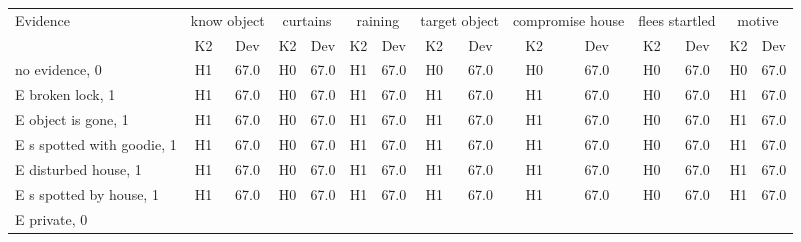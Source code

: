 \begin{table}\begin{tabular}{l|cc|cc|cc|cc|cc|cc|cc}\toprule\multirow{2}{*}{Evidence} & \multicolumn{2}{c}{know object}& \multicolumn{2}{c}{curtains}& \multicolumn{2}{c}{raining}& \multicolumn{2}{c}{target object}& \multicolumn{2}{c}{compromise house}& \multicolumn{2}{c}{flees startled}& \multicolumn{2}{c}{motive}\\& {K2} & {Dev}& {K2} & {Dev}& {K2} & {Dev}& {K2} & {Dev}& {K2} & {Dev}& {K2} & {Dev}& {K2} & {Dev}\\\midrule
no evidence, 0 & \cellcolor{Bittersweet}H1&\cellcolor{Bittersweet}67.0&\cellcolor{Bittersweet}H0&\cellcolor{Bittersweet}67.0&\cellcolor{Bittersweet}H1&\cellcolor{Bittersweet}67.0&\cellcolor{Bittersweet}H0&\cellcolor{Bittersweet}67.0&\cellcolor{Bittersweet}H0&\cellcolor{Bittersweet}67.0&\cellcolor{Bittersweet}H0&\cellcolor{Bittersweet}67.0&\cellcolor{Bittersweet}H0&\cellcolor{Bittersweet}67.0\\E broken lock, 1 & \cellcolor{Bittersweet}H1&\cellcolor{Bittersweet}67.0&\cellcolor{Bittersweet}H0&\cellcolor{Bittersweet}67.0&\cellcolor{Bittersweet}H1&\cellcolor{Bittersweet}67.0&\cellcolor{Bittersweet}H1&\cellcolor{Bittersweet}67.0&\cellcolor{Bittersweet}H1&\cellcolor{Bittersweet}67.0&\cellcolor{Bittersweet}H0&\cellcolor{Bittersweet}67.0&\cellcolor{Bittersweet}H1&\cellcolor{Bittersweet}67.0\\E object is gone, 1 & \cellcolor{Bittersweet}H1&\cellcolor{Bittersweet}67.0&\cellcolor{Bittersweet}H0&\cellcolor{Bittersweet}67.0&\cellcolor{Bittersweet}H1&\cellcolor{Bittersweet}67.0&\cellcolor{Bittersweet}H1&\cellcolor{Bittersweet}67.0&\cellcolor{Bittersweet}H1&\cellcolor{Bittersweet}67.0&\cellcolor{Bittersweet}H0&\cellcolor{Bittersweet}67.0&\cellcolor{Bittersweet}H1&\cellcolor{Bittersweet}67.0\\E s spotted with goodie, 1 & \cellcolor{Bittersweet}H1&\cellcolor{Bittersweet}67.0&\cellcolor{Bittersweet}H0&\cellcolor{Bittersweet}67.0&\cellcolor{Bittersweet}H1&\cellcolor{Bittersweet}67.0&\cellcolor{Bittersweet}H1&\cellcolor{Bittersweet}67.0&\cellcolor{Bittersweet}H1&\cellcolor{Bittersweet}67.0&\cellcolor{Bittersweet}H0&\cellcolor{Bittersweet}67.0&\cellcolor{Bittersweet}H1&\cellcolor{Bittersweet}67.0\\E disturbed house, 1 & \cellcolor{Bittersweet}H1&\cellcolor{Bittersweet}67.0&\cellcolor{Bittersweet}H0&\cellcolor{Bittersweet}67.0&\cellcolor{Bittersweet}H1&\cellcolor{Bittersweet}67.0&\cellcolor{Bittersweet}H1&\cellcolor{Bittersweet}67.0&\cellcolor{Bittersweet}H1&\cellcolor{Bittersweet}67.0&\cellcolor{Bittersweet}H0&\cellcolor{Bittersweet}67.0&\cellcolor{Bittersweet}H1&\cellcolor{Bittersweet}67.0\\E s spotted by house, 1 & \cellcolor{Bittersweet}H1&\cellcolor{Bittersweet}67.0&\cellcolor{Bittersweet}H0&\cellcolor{Bittersweet}67.0&\cellcolor{Bittersweet}H1&\cellcolor{Bittersweet}67.0&\cellcolor{Bittersweet}H1&\cellcolor{Bittersweet}67.0&\cellcolor{Bittersweet}H1&\cellcolor{Bittersweet}67.0&\cellcolor{Bittersweet}H0&\cellcolor{Bittersweet}67.0&\cellcolor{Bittersweet}H1&\cellcolor{Bittersweet}67.0\\E private, 0 & 
\end{tabular}
\end{table}

